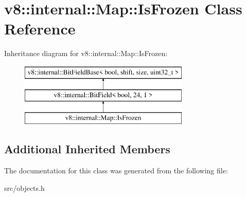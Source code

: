 \hypertarget{classv8_1_1internal_1_1_map_1_1_is_frozen}{}\section{v8\+:\+:internal\+:\+:Map\+:\+:Is\+Frozen Class Reference}
\label{classv8_1_1internal_1_1_map_1_1_is_frozen}
Inheritance diagram for v8\+:\+:internal\+:\+:Map\+:\+:Is\+Frozen\+:\begin{figure}[H]
\begin{center}
\leavevmode
\includegraphics[height=3.000000cm]{classv8_1_1internal_1_1_map_1_1_is_frozen}
\end{center}
\end{figure}
\subsection*{Additional Inherited Members}


The documentation for this class was generated from the following file\+:\begin{DoxyCompactItemize}
\item 
src/objects.\+h\end{DoxyCompactItemize}
